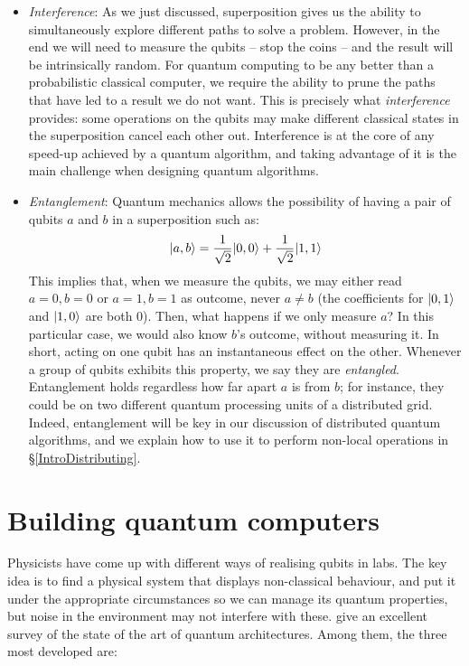 \begin{itemize}
  \item \textit{Interference}: As we just discussed, superposition gives us the ability to simultaneously explore different paths to solve a problem. However, in the end we will need to measure the qubits -- stop the coins -- and the result will be intrinsically random. For quantum computing to be any better than a probabilistic classical computer, we require the ability to prune the paths that have led to a result we do not want. This is precisely what \textit{interference} provides: some operations on the qubits may make different classical states in the superposition cancel each other out. Interference is at the core of any speed-up achieved by a quantum algorithm, and taking advantage of it is the main challenge when designing quantum algorithms.

  \item \textit{Entanglement}: Quantum mechanics allows the possibility of having a pair of qubits \(a\) and \(b\) in a superposition such as: \[\vert a,b \rangle = \frac{1}{\sqrt{2}}\vert 0,0 \rangle + \frac{1}{\sqrt{2}}\vert 1,1 \rangle\] This implies that, when we measure the qubits, we may either read \(a=0, b=0\) or \(a=1, b=1\) as outcome, never \(a\not=b\) (the coefficients for \(\vert 0,1 \rangle\) and \(\vert 1,0 \rangle\) are both \(0\)). Then, what happens if we only measure \(a\)? In this particular case, we would also know \(b\)'s outcome, without measuring it. In short, acting on one qubit has an instantaneous effect on the other. Whenever a group of qubits exhibits this property, we say they are \textit{entangled}. Entanglement holds regardless how far apart \(a\) is from \(b\); for instance, they could be on two different quantum processing units of a distributed grid. Indeed, entanglement will be key in our discussion of distributed quantum algorithms, and we explain how to use it to perform non-local operations in \S\ref{IntroDistributing}.

\end{itemize}


\section{Building quantum computers}
\label{Hardware}

Physicists have come up with different ways of realising qubits in labs. The key idea is to find a physical system that displays non-classical behaviour, and put it under the appropriate circumstances so we can manage its quantum properties, but noise in the environment may not interfere with these. \citet{ArchitectureSurvey} give an excellent survey of the state of the art of quantum architectures. Among them, the three most developed are:


